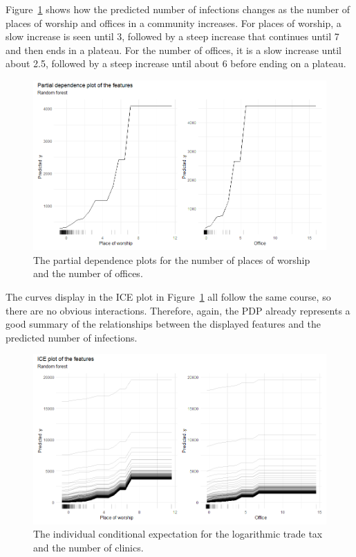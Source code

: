 Figure~\ref{pdp_rf_norway_1} shows how the predicted number of infections changes as the number of places of worship and offices in a community increases. For places of worship, a slow increase is seen until 3, followed by a steep increase that continues until 7 and then ends in a plateau. For the number of offices, it is a slow increase until about 2.5, followed by a steep increase until about 6 before ending on a plateau.
\begin{figure}[H]
  \centering
  \includegraphics[width = \textwidth]{pdp_rf_norway_1.png}
  \caption{The partial dependence plots for the number of places of worship and the number of offices.}
  \label{pdp_rf_norway_1}
\end{figure}
The curves display in the ICE plot in Figure~\ref{pdp_rf_norway_1} all follow the same course, so there are no obvious interactions. Therefore, again, the PDP already represents a good summary of the relationships between the displayed features and the predicted number of infections. \\
\begin{figure}[H]
  \centering
  \includegraphics[width = \textwidth]{ice_rf_norway_1.png}
  \caption{The individual conditional expectation for the logarithmic trade tax and the number of clinics.}
  \label{ice_rf_norway_1}
\end{figure}
